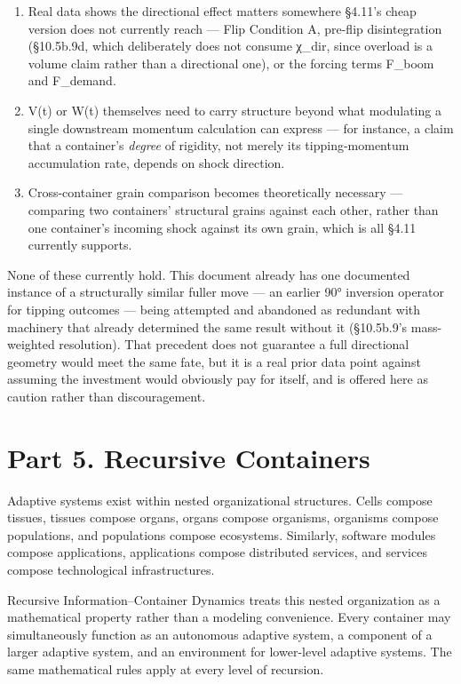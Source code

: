 \documentclass[
]{article}
\begin{document}
\begin{enumerate}
\def\labelenumi{\arabic{enumi}.}
\item
  Real data shows the directional effect matters somewhere §4.11's cheap
  version does not currently reach --- Flip Condition A, pre-flip
  disintegration (§10.5b.9d, which deliberately does not consume χ\_dir,
  since overload is a volume claim rather than a directional one), or
  the forcing terms F\_boom and F\_demand.
\item
  V(t) or W(t) themselves need to carry structure beyond what modulating
  a single downstream momentum calculation can express --- for instance,
  a claim that a container's \emph{degree} of rigidity, not merely its
  tipping-momentum accumulation rate, depends on shock direction.
\item
  Cross-container grain comparison becomes theoretically necessary ---
  comparing two containers' structural grains against each other, rather
  than one container's incoming shock against its own grain, which is
  all §4.11 currently supports.
\end{enumerate}

None of these currently hold. This document already has one documented
instance of a structurally similar fuller move --- an earlier 90°
inversion operator for tipping outcomes --- being attempted and
abandoned as redundant with machinery that already determined the same
result without it (§10.5b.9's mass-weighted resolution). That precedent
does not guarantee a full directional geometry would meet the same fate,
but it is a real prior data point against assuming the investment would
obviously pay for itself, and is offered here as caution rather than
discouragement.

\hypertarget{part-5.-recursive-containers}{%
\section{Part 5. Recursive
Containers}\label{part-5.-recursive-containers}}

Adaptive systems exist within nested organizational structures. Cells
compose tissues, tissues compose organs, organs compose organisms,
organisms compose populations, and populations compose ecosystems.
Similarly, software modules compose applications, applications compose
distributed services, and services compose technological
infrastructures.

Recursive Information--Container Dynamics treats this nested
organization as a mathematical property rather than a modeling
convenience. Every container may simultaneously function as an
autonomous adaptive system, a component of a larger adaptive system, and
an environment for lower-level adaptive systems. The same mathematical
rules apply at every level of recursion.
\end{document}
